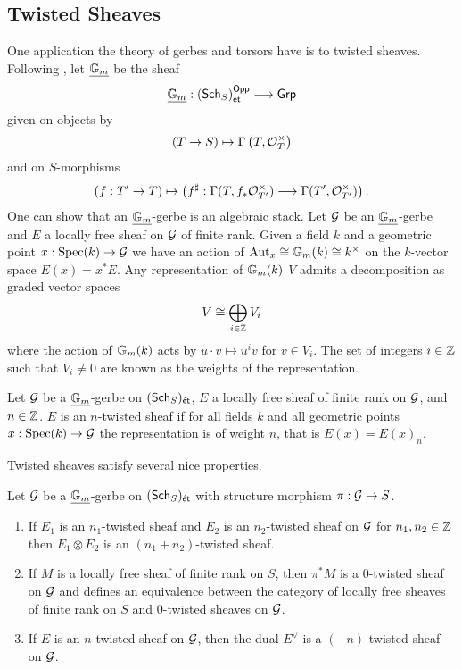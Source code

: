 \subsection{Twisted Sheaves}\label{subsec: twisted sheaves}
One application the theory of gerbes and torsors have is to twisted sheaves. Following , let $\underline{\mathbb{G}_{m}}$ be the sheaf 
$$\underline{\mathbb{G}_{m}}:\left(\mathsf{Sch}_{S}\right)_{\mathsf{\acute{e}t}}^{\mathsf{Opp}}\longrightarrow\mathsf{Grp}$$
given on objects by 
$$(T\to S)\mapsto \Gamma\left(T,\mathcal{O}_{T}^{\times}\right)$$
and on $S$-morphisms
$$(f:T'\to T)\mapsto \left(f^{\sharp}:\Gamma(T,f_{*}\mathcal{O}_{T'}^{\times})\longrightarrow \Gamma(T',\mathcal{O}_{T'}^{\times})\right).$$
One can show that an $\underline{\mathbb{G}_{m}}$-gerbe is an algebraic stack. Let $\mathcal{G}$ be an $\underline{\mathbb{G}_{m}}$-gerbe and $E$ a locally free sheaf on $\mathcal{G}$ of finite rank. Given a field $k$ and a geometric point $x:\operatorname{Spec}(k)\to\mathcal{G}$ we have an action of $\mathrm{Aut}_{x}\cong\mathbb{G}_{m}(k)\cong k^{\times}$ on the $k$-vector space $E(x)=x^{*}E$. Any representation of $\mathbb{G}_{m}(k)$ $V$ admits a decomposition as graded vector spaces 
$$V\cong\bigoplus_{i\in\mathbb{Z}}V_{i}$$
where the action of $\mathbb{G}_{m}(k)$ acts by $u\cdot v\mapsto u^{i}v$ for $v\in V_{i}$. The set of integers $i\in\mathbb{Z}$ such that $V_{i}\neq0$ are known as the weights of the representation. 
\begin{definition}\label{def: twisted sheaf}
    Let $\mathcal{G}$ be a $\underline{\mathbb{G}_{m}}$-gerbe on $(\mathsf{Sch}_{S})_{\mathsf{\acute{e}t}}$, $E$ a locally free sheaf of finite rank on $\mathcal{G}$, and $n\in\mathbb{Z}$. $E$ is an $n$-twisted sheaf if for all fields $k$ and all geometric points $x:\operatorname{Spec}(k)\to\mathcal{G}$ the representation is of weight $n$, that is $E(x)=E(x)_{n}$.
\end{definition}
Twisted sheaves satisfy several nice properties. 
\begin{lemma}\label{lem: properties of twisted sheaves}
    Let $\mathcal{G}$ be a $\underline{\mathbb{G}_{m}}$-gerbe on $(\mathsf{Sch}_{S})_{\mathsf{\acute{e}t}}$ with structure morphism $\pi:\mathcal{G}\to S$. 
    \begin{enumerate}[label=(\alph*)]
        \item If $E_{1}$ is an $n_{1}$-twisted sheaf and $E_{2}$ is an $n_{2}$-twisted sheaf on $\mathcal{G}$ for $n_{1},n_{2}\in\mathbb{Z}$ then $E_{1}\otimes E_{2}$ is an $(n_{1}+n_{2})$-twisted sheaf. 
        \item If $M$ is a locally free sheaf of finite rank on $S$, then $\pi^{*}M$ is a 0-twisted sheaf on $\mathcal{G}$ and defines an equivalence between the category of locally free sheaves of finite rank on $S$ and $0$-twisted sheaves on $\mathcal{G}$. 
        \item If $E$ is an $n$-twisted sheaf on $\mathcal{G}$, then the dual $E^{\vee}$ is a $(-n)$-twisted sheaf on $\mathcal{G}$. 
    \end{enumerate}
\end{lemma}
